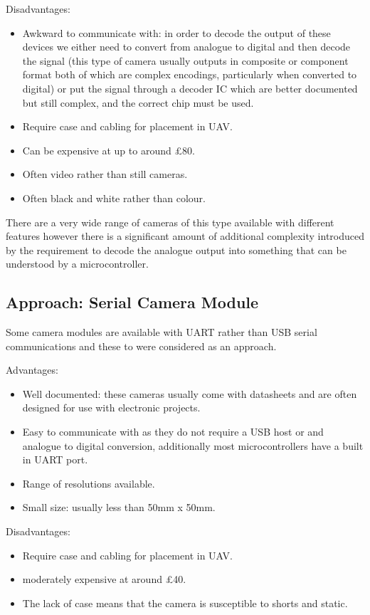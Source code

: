 Disadvantages:
     \begin{itemize}
        \item Awkward to communicate with: in order to decode the output of these devices we either need to convert from analogue to digital and then decode the signal (this type of camera usually outputs in composite or component format both of which are complex encodings, particularly when converted to digital) or put the signal through a decoder IC which are better documented but still complex, and the correct chip must be used.
        \item Require case and cabling for placement in UAV.
		\item Can be expensive at up to around \pounds 80.
		\item Often video rather than still cameras.
		\item Often black and white rather than colour.
     \end{itemize}

There are a very wide range of cameras of this type available with different features however there is a significant amount of additional complexity introduced by the requirement to decode the analogue output into something that can be understood by a microcontroller.

\subsection{Approach: Serial Camera Module}
\label{sec:Serial_option}

Some camera modules are available with UART rather than USB serial communications and these to were considered as an approach.

Advantages:
      \begin{itemize}
      	 \item Well documented: these cameras usually come with datasheets and are often designed for use with electronic projects.
		 \item Easy to communicate with as they do not require a USB host or and analogue to digital conversion, additionally most microcontrollers have a built in UART port.
         \item Range of resolutions available.
		 \item Small size: usually less than 50mm x 50mm.
		 
     \end{itemize}

Disadvantages:
     \begin{itemize}
        \item Require case and cabling for placement in UAV.
		\item moderately expensive at around \pounds 40.
        \item The lack of case means that the camera is susceptible to shorts and static.
     \end{itemize}

